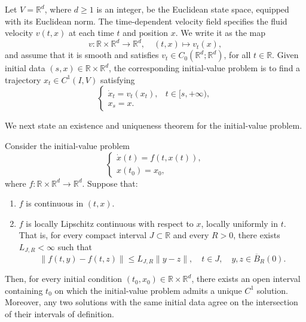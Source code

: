 \documentclass[12pt,a4paper,oneside]{book}
\begin{document}
Let $V=\mathbb R^d$, where $d\geq1$ is an integer, be the Euclidean state space, equipped with its Euclidean norm. The
time-dependent velocity field specifies the fluid velocity $v(t,x)$ at each time $t$ and position $x$. We write it as the
map
\begin{equation*}
    v: \mathbb{R} \times \mathbb{R}^{d} \to \mathbb{R}^{d}, \quad (t,x) \mapsto v_t(x),
\end{equation*}
and assume that it is smooth and satisfies $v_t\in C_0(\mathbb R^d;\mathbb R^d)$, for all $t\in\mathbb R$. Given initial
data $(s,x)\in \mathbb{R} \times \mathbb{R}^{d}$, the corresponding initial-value problem is to find a trajectory $x_t\in C^1(I,V)$
satisfying
\begin{equation}
    \begin{cases}
        \dot x_t=v_t(x_t), & t\in [s,+\infty),\\
        x_s=x.
    \end{cases}
    \label{eq:flowode}
\end{equation}

We next state an existence and uniqueness theorem for the initial-value problem.

\begin{theorem}
\label{thm:picard-lindelof}

Consider the initial-value problem
\begin{equation*}
    \begin{cases}
        \dot{x}(t)=f(t,x(t)),\\
        x(t_0)=x_0,
    \end{cases}
\end{equation*}
where $f:\mathbb R\times\mathbb R^d\to\mathbb R^d$. Suppose that:
\begin{enumerate}
    \item $f$ is continuous in $(t,x)$.

    \item $f$ is locally Lipschitz continuous with respect to $x$, locally uniformly in $t$. That is, for every compact
        interval $J\subset\mathbb R$ and every $R>0$, there exists $L_{J,R}<\infty$ such that
        \begin{equation*}
            \|f(t,y)-f(t,z)\| \leq L_{J,R}\|y-z\|, \quad
            t\in J,\quad y,z\in\overline B_R(0).
        \end{equation*}
\end{enumerate}
Then, for every initial condition $(t_0,x_0) \in \mathbb R\times\mathbb R^d$, there exists an open interval containing
$t_0$ on which the initial-value problem admits a unique $C^1$ solution. Moreover, any two solutions with the same initial
data agree on the intersection of their intervals of definition.
\end{theorem}
\end{document}
